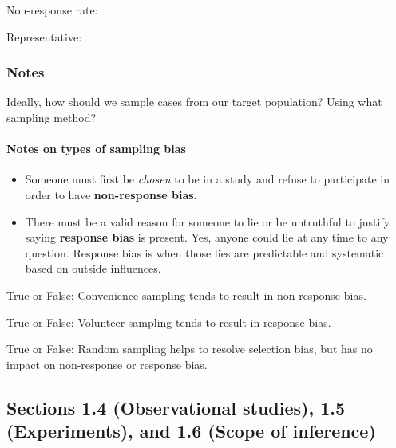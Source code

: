 \documentclass[
]{report}
\newcommand{\rgs}{\vspace{12pt}} %
\begin{document}
Non-response rate:
\rgs

Representative:
\rgs

\hypertarget{notes-1}{%
\subsubsection*{Notes}\label{notes-1}}

Ideally, how should we sample cases from our target population? Using what sampling method?
\rgs

\hypertarget{notes-on-types-of-sampling-bias}{%
\paragraph*{Notes on types of sampling bias}\label{notes-on-types-of-sampling-bias}}

\begin{itemize}
\item
  Someone must first be \emph{chosen} to be in a study and refuse to participate in order to have \textbf{non-response bias}.
\item
  There must be a valid reason for someone to lie or be untruthful to justify saying \textbf{response bias} is present. Yes, anyone could lie at any time to any question. Response bias is when those lies are predictable and systematic based on outside influences.
  \rgs
\end{itemize}

True or False: Convenience sampling tends to result in non-response bias.

True or False: Volunteer sampling tends to result in response bias.

True or False: Random sampling helps to resolve selection bias, but has no impact on non-response or response bias.

\hypertarget{sections-1.4-observational-studies-1.5-experiments-and-1.6-scope-of-inference}{%
\subsection*{Sections 1.4 (Observational studies), 1.5 (Experiments), and 1.6 (Scope of inference)}\label{sections-1.4-observational-studies-1.5-experiments-and-1.6-scope-of-inference}}

\end{document}
